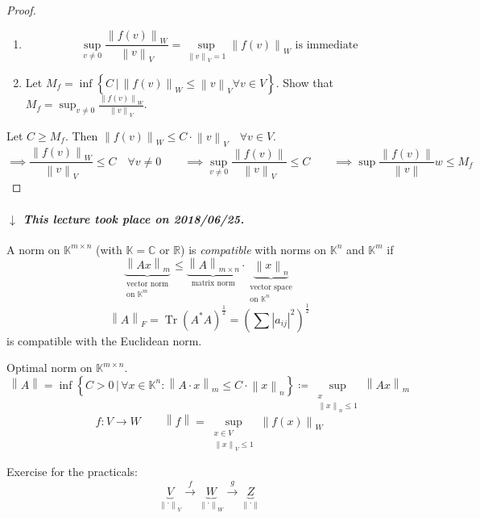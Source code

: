 \documentclass[a4paper]{article}
\numberwithin{lecref}{section}
\newcommand{\setdef}[2]{\left\{\left.#1\,\right|\,#2\right\}}
\newcommand{\norm}[1]{\left\|#1\right\|}
\newcommand{\card}[1]{\left|#1\right|}
\newcommand{\dateref}[1]{%
  \begin{mdframed}[backgroundcolor=gray!10,innerbottommargin=0pt,innertopmargin=0pt]
    \paragraph{\textit{$\downarrow$ This lecture took place on #1.}}%
  \end{mdframed}%
}
\begin{document}
\begin{proof}
  \begin{enumerate}
    \item \[ \sup_{v \neq 0} \frac{\norm{f(v)}_W}{\norm{v}_V} = \sup_{\norm{v}_V = 1} \norm{f(v)}_W \text{ is immediate} \]
    \item Let $M_f = \inf\setdef{C}{\norm{f(v)}_W \leq \norm{v}_V \forall v \in V}$. Show that $M_f = \sup_{v \neq 0} \frac{\norm{f(v)}_W}{\norm{v}_V}$.
  \end{enumerate}

  Let $C \geq M_f$. Then $\norm{f(v)}_W \leq C \cdot \norm{v}_V \quad \forall v \in V$.
  \[
    \implies \frac{\norm{f(v)}_W}{\norm{v}_V} \leq C \quad \forall v \neq 0
    \qquad \implies \sup_{v \neq 0} \frac{\norm{f(v)}}{\norm{v}_V} \leq C
    \qquad \implies \sup{\frac{\norm{f(v)}}{\norm{v}}} w \leq M_f
  \]
\end{proof}

\dateref{2018/06/25}

A norm on $\mathbb K^{m \times n}$ (with $\mathbb K = \mathbb C$ or $\mathbb R$) is \emph{compatible} with norms on $\mathbb K^n$ and $\mathbb K^m$ if
\[
  \underbrace{\norm{Ax}_m}_{\substack{\text{vector norm} \\ \text{on } \mathbb K^m}}
  \leq
  \underbrace{\norm{A}_{m \times n}}_{\text{matrix norm}} \cdot \underbrace{\norm{x}_n}_{\substack{\text{vector space} \\ \text{on } \mathbb K^n}}
\]
\[ \norm{A}_F = \operatorname{Tr}(A^* A)^{\frac12} = \left(\sum \card{a_{ij}}^2\right)^{\frac12} \]
is compatible with the Euclidean norm.

Optimal norm on $\mathbb K^{m \times n}$.
\[ \norm A = \inf\setdef{C > 0}{\forall x \in \mathbb K^n: \norm{A \cdot x}_m \leq C \cdot \norm{x}_n} \coloneqq \sup_{\substack{x \\ \norm{x}_n \leq 1}} \norm{Ax}_m \]
\[ f: V \to W \qquad \norm{f} = \sup_{\substack{x \in V \\ \norm{x}_V \leq 1}} \norm{f(x)}_W \]

Exercise for the practicals:
\[ \underbrace{V}_{\norm{\cdot}_V} \xrightarrow f \underbrace{W}_{\norm{\cdot}_W} \xrightarrow g \underbrace{Z}_{\norm{\cdot}} \]
\end{document}
